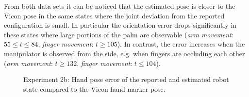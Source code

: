 From both data sets it can be noticed that the estimated pose is closer to the Vicon pose in the same states where the joint deviation from the reported configuration is small. In particular the orientation error drops significantly in these states where large portions of the palm are observable (\textit{arm movement}: $55\leq t \leq84$, \textit{finger movement}: $t \geq 105$). In contrast, the error increases when the manipulator is observed from the side, e.g. when fingers are occluding each other (\textit{arm movement}: $t \geq 132$, \textit{finger movement}: $t \leq 104$).

\begin{figure}[h]
\centering
{}


\caption[Finger movement, hand pose error]{Experiment 2b: Hand pose error of the reported and estimated robot state compared to the Vicon hand marker pose.}
\label{fig:vic_error_finger_movement}
\end{figure}


